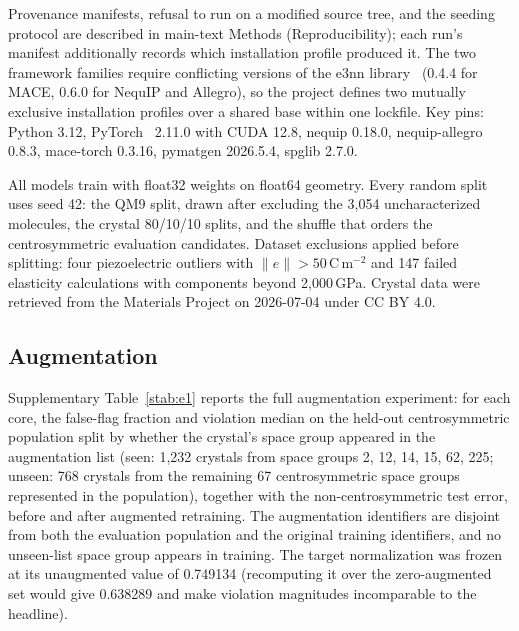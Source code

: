 Provenance manifests, refusal to run on a modified source tree, and the seeding protocol are described in main-text Methods (Reproducibility); each run's manifest additionally records which installation profile produced it. The two framework families require conflicting versions of the e3nn library~\cite{geiger2022e3nn} (0.4.4 for MACE, 0.6.0 for NequIP and Allegro), so the project defines two mutually exclusive installation profiles over a shared base within one lockfile. Key pins: Python 3.12, PyTorch~\cite{paszke2019pytorch} 2.11.0 with CUDA 12.8, nequip 0.18.0, nequip-allegro 0.8.3, mace-torch 0.3.16, pymatgen 2026.5.4, spglib 2.7.0.

All models train with float32 weights on float64 geometry. Every random split uses seed 42: the QM9 split, drawn after excluding the 3,054 uncharacterized molecules, the crystal 80/10/10 splits, and the shuffle that orders the centrosymmetric evaluation candidates. Dataset exclusions applied before splitting: four piezoelectric outliers with $\lVert e \rVert > 50$\,C\,m$^{-2}$ and 147 failed elasticity calculations with components beyond 2,000\,GPa. Crystal data were retrieved from the Materials Project on 2026-07-04 under CC BY 4.0.


\label{snote:augmentation}

\subsection*{Augmentation}

Supplementary Table~\ref{stab:e1} reports the full augmentation experiment: for each core, the false-flag fraction and violation median on the held-out centrosymmetric population split by whether the crystal's space group appeared in the augmentation list (seen: 1,232 crystals from space groups 2, 12, 14, 15, 62, 225; unseen: 768 crystals from the remaining 67 centrosymmetric space groups represented in the population), together with the non-centrosymmetric test error, before and after augmented retraining. The augmentation identifiers are disjoint from both the evaluation population and the original training identifiers, and no unseen-list space group appears in training. The target normalization was frozen at its unaugmented value of 0.749134 (recomputing it over the zero-augmented set would give 0.638289 and make violation magnitudes incomparable to the headline).


